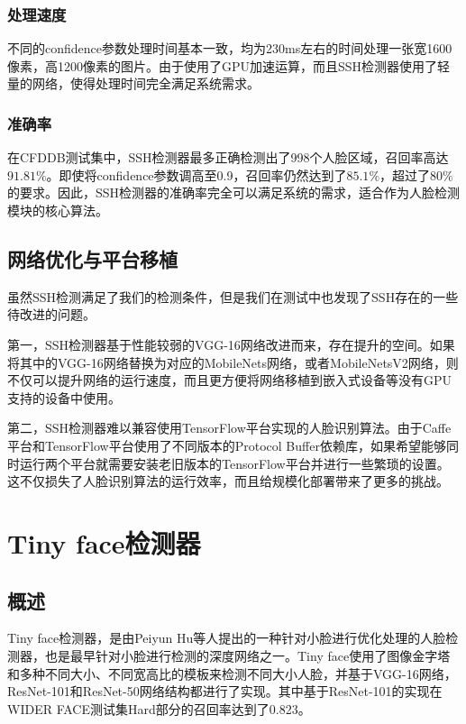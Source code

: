 \subsubsection{处理速度}

不同的confidence参数处理时间基本一致，均为230ms左右的时间处理一张宽1600像素，高1200像素的图片。由于使用了GPU加速运算，而且SSH检测器使用了轻量的网络，使得处理时间完全满足系统需求。

\subsubsection{准确率}

在CFDDB测试集中，SSH检测器最多正确检测出了998个人脸区域，召回率高达$91.81\%$。即使将confidence参数调高至0.9，召回率仍然达到了$85.1\%$，超过了$80\%$的要求。因此，SSH检测器的准确率完全可以满足系统的需求，适合作为人脸检测模块的核心算法。

\subsection{网络优化与平台移植}

虽然SSH检测满足了我们的检测条件，但是我们在测试中也发现了SSH存在的一些待改进的问题。

第一，SSH检测器基于性能较弱的VGG-16网络\cite{simonyan2014very}改进而来，存在提升的空间。如果将其中的VGG-16网络替换为对应的MobileNets网络\cite{howard2017mobilenets}，或者MobileNetsV2网络\cite{sandler2018inverted}，则不仅可以提升网络的运行速度，而且更方便将网络移植到嵌入式设备等没有GPU支持的设备中使用。

第二，SSH检测器难以兼容使用TensorFlow平台实现的人脸识别算法。由于Caffe平台和TensorFlow平台使用了不同版本的Protocol Buffer依赖库，如果希望能够同时运行两个平台就需要安装老旧版本的TensorFlow平台并进行一些繁琐的设置。这不仅损失了人脸识别算法的运行效率，而且给规模化部署带来了更多的挑战。

\section{Tiny face检测器}

\subsection{概述}

Tiny face检测器\cite{hu2017finding}，是由Peiyun Hu等人提出的一种针对小脸进行优化处理的人脸检测器，也是最早针对小脸进行检测的深度网络之一。Tiny face使用了图像金字塔和多种不同大小、不同宽高比的模板来检测不同大小人脸，并基于VGG-16网络\cite{simonyan2014very}，ResNet-101和ResNet-50网络\cite{he2016deep}结构都进行了实现。其中基于ResNet-101的实现在WIDER FACE测试集Hard部分的召回率达到了0.823\cite{hu2017finding}。

